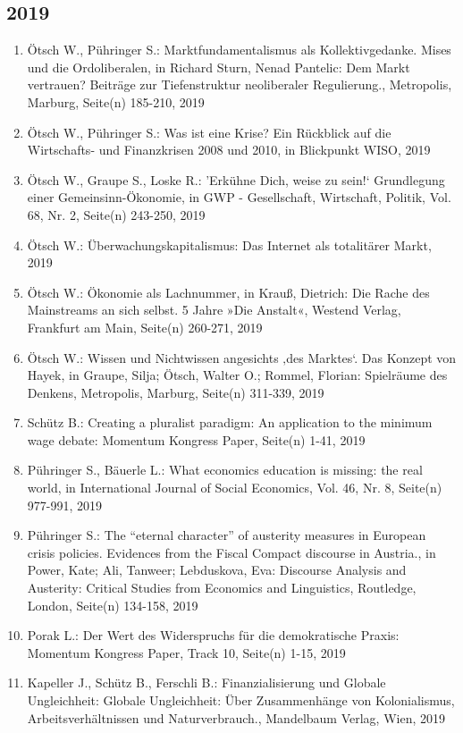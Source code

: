 \subsection*{2019}
\begin{enumerate}
    	 \item Ötsch W., Pühringer S.: Marktfundamentalismus als Kollektivgedanke. Mises und die Ordoliberalen, in Richard Sturn, Nenad Pantelic: Dem Markt vertrauen? Beiträge zur Tiefenstruktur neoliberaler Regulierung., Metropolis, Marburg, Seite(n) 185-210, 2019
	 \item Ötsch W., Pühringer S.: Was ist eine Krise? Ein Rückblick auf die Wirtschafts- und Finanzkrisen 2008 und 2010, in Blickpunkt WISO, 2019
	 \item Ötsch W., Graupe S., Loske R.: ’Erkühne Dich, weise zu sein!‘ Grundlegung einer Gemeinsinn-Ökonomie, in GWP - Gesellschaft, Wirtschaft, Politik, Vol. 68, Nr. 2, Seite(n) 243-250, 2019
	 \item Ötsch W.: Überwachungskapitalismus: Das Internet als totalitärer Markt, 2019
	 \item Ötsch W.: Ökonomie als Lachnummer, in Krauß, Dietrich: Die Rache des Mainstreams an sich selbst. 5 Jahre »Die Anstalt«, Westend Verlag, Frankfurt am Main, Seite(n) 260-271, 2019
	 \item Ötsch W.: Wissen und Nichtwissen angesichts ‚des Marktes‘. Das Konzept von Hayek, in Graupe, Silja; Ötsch, Walter O.; Rommel, Florian: Spielräume des Denkens, Metropolis, Marburg, Seite(n) 311-339, 2019
	 \item Schütz B.: Creating a pluralist paradigm: An application to the minimum wage debate: Momentum Kongress Paper, Seite(n) 1-41, 2019
	 \item Pühringer S., Bäuerle L.: What economics education is missing: the real world, in International Journal of Social Economics, Vol. 46, Nr. 8, Seite(n) 977-991, 2019
	 \item Pühringer S.: The “eternal character” of austerity measures in European crisis policies. Evidences from the Fiscal Compact discourse in Austria., in Power, Kate; Ali, Tanweer; Lebduskova, Eva: Discourse Analysis and Austerity: Critical Studies from Economics and Linguistics, Routledge, London, Seite(n) 134-158, 2019
	 \item Porak L.: Der Wert des Widerspruchs für die demokratische Praxis: Momentum Kongress Paper, Track 10, Seite(n) 1-15, 2019
	 \item Kapeller J., Schütz B., Ferschli B.: Finanzialisierung und Globale Ungleichheit: Globale Ungleichheit: Über Zusammenhänge von Kolonialismus, Arbeitsverhältnissen und Naturverbrauch., Mandelbaum Verlag, Wien, 2019

\end{enumerate}
